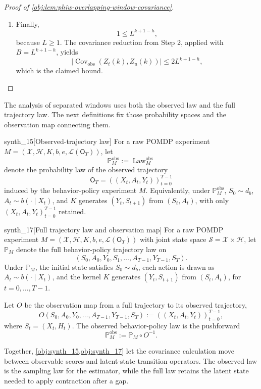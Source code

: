 \documentclass[11pt]{article}
\begin{document}
\begin{proof}[Proof of \cref{obj:lem:phiw-overlapping-window-covariance}]
\begin{enumerate}
\item Finally,
\[
1\le L^{k+1-h},
\]
because \(L\ge 1\). The covariance reduction from Step 2, applied with \(B=L^{k+1-h}\), yields
\[
\bigl|\operatorname{Cov}_{\mathrm{obs}}(Z_t(k),Z_u(k))\bigr|
\le
2L^{k+1-h},
\]
which is the claimed bound.
\end{enumerate}
\end{proof}

The analysis of separated windows uses both the observed law and the full trajectory law. The next definitions fix those probability spaces and the observation map connecting them.

\begin{definitionv}{synth_15}[Observed-trajectory law]
For a raw POMDP experiment \(M=(\mathcal X,\mathcal H,K,b,e,\mathcal L(\mathsf O_T))\), let
\[
\mathbb P_M^{\mathrm{obs}}:=\operatorname{Law}^{\mathrm{obs}}_M
\]
denote the probability law of the observed trajectory
\[
\mathsf O_T=((X_t,A_t,Y_t))_{t=0}^{T-1}
\]
induced by the behavior-policy experiment \(M\). Equivalently, under \(\mathbb P_M^{\mathrm{obs}}\), \(S_0\sim d_b\), \(A_t\sim b(\cdot\mid X_t)\), and \(K\) generates \((Y_t,S_{t+1})\) from \((S_t,A_t)\), with only \((X_t,A_t,Y_t)_{t=0}^{T-1}\) retained.
\end{definitionv}

\begin{definitionv}{synth_17}[Full trajectory law and observation map]
For a raw POMDP experiment \(M=(\mathcal X,\mathcal H,K,b,e,\mathcal L(\mathsf O_T))\) with joint state space \(\mathcal S=\mathcal X\times\mathcal H\), let \(\mathbb P_M\) denote the full behavior-policy trajectory law on
\[
(S_0,A_0,Y_0,S_1,\ldots,A_{T-1},Y_{T-1},S_T).
\]
Under \(\mathbb P_M\), the initial state satisfies \(S_0\sim d_b\), each action is drawn as \(A_t\sim b(\cdot\mid X_t)\), and the kernel \(K\) generates \((Y_t,S_{t+1})\) from \((S_t,A_t)\), for \(t=0,\ldots,T-1\).

Let \(O\) be the observation map from a full trajectory to its observed trajectory,
\[
O(S_0,A_0,Y_0,\ldots,A_{T-1},Y_{T-1},S_T)
:=((X_t,A_t,Y_t))_{t=0}^{T-1},
\]
where \(S_t=(X_t,H_t)\). The observed behavior-policy law is the pushforward
\[
\mathbb P_M^{\mathrm{obs}}:=\mathbb P_M\circ O^{-1}.
\]
\end{definitionv}

Together, \cref{obj:synth_15,obj:synth_17} let the covariance calculation move between observable scores and latent-state transition operators. The observed law is the sampling law for the estimator, while the full law retains the latent state needed to apply contraction after a gap.
\end{document}
